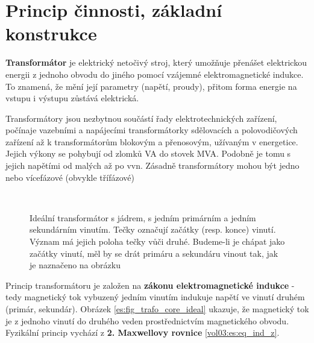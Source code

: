   \section{Princip činnosti, základní konstrukce}
    \begin{definition}
      \textbf{Transformátor} je elektrický netočivý stroj, který umožňuje pře\-nášet elektrickou 
      energii z jednoho obvodu do jiného pomocí vzá\-jemné elektromagnetické indukce. To znamená, 
      že mění její parametry (napětí, proudy), přitom forma energie na vstupu i výstupu zůstává 
      elektrická.
    \end{definition}

    Transformátory jsou nezbytnou součástí řady elektrotechnických zařízení, počínaje vazebními a 
    napájecími transformátorky sdělovacích a polovodičových zařízení až k transformátorům blokovým 
    a přenosovým, užívaným v energetice. Jejich výkony se pohybují od zlomků VA do stovek MVA. 
    Podobně je tomu s jejich napětími od malých až po vvn. Zásadně transformátory  mohou být jedno 
    nebo vícefázové (obvykle třífázové)

    \begin{figure}[ht!]
      \centering
        {}                \\
        {}
      \caption{Ideální transformátor s jádrem, s jedním primárním a jedním sekundárním 
              vinutím. Tečky označují začátky (resp. konce) vinutí. Význam má jejich poloha tečky 
              vůči druhé. Budeme-li je chápat jako začátky vinutí, měl by se drát primáru a 
              sekundáru vinout tak, jak je naznačeno na obrázku}
      \label{es:fig_trafo_ideal}
    \end{figure}
    Princip transformátoru je založen na \textbf{zákonu elektromagnetické indukce} - tedy 
    magnetický tok vybuzený jedním vinutím indukuje napětí ve vinutí druhém (primár, sekundár). 
    Obrázek \ref{es:fig_trafo_core_ideal} ukazuje, že magnetický tok je z jednoho vinutí do druhého 
    veden  prostřednictvím magnetického obvodu. Fyzikální princip vychází z \textbf{2. Maxwellovy
    rovnice} \ref{vol03:es:eq_ind_z}.

